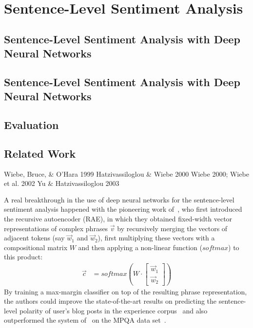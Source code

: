 \section{Sentence-Level Sentiment Analysis}\label{sec:snt:slsa}

\subsection{Sentence-Level Sentiment Analysis with Deep Neural Networks}

\subsection{Sentence-Level Sentiment Analysis with Deep Neural Networks}

\subsection{Evaluation}

\subsection{Related Work}

\citet{Kobayashi:07}
Wiebe, Bruce, \& O'Hara 1999
Hatzivassiloglou \& Wiebe 2000
Wiebe 2000; Wiebe et al. 2002
Yu \& Hatzivassiloglou 2003


\citet{Yessenalina:11}

A real breakthrough in the use of deep neural networks for the
sentence-level sentiment analysis happened with the pioneering work
of~\citet{Socher:11}, who first introduced the recursive autoencoder
(RAE), in which they obtained fixed-width vector representations of
complex phrases $\vec{v}$ by recursively merging the vectors of
adjacent tokens (say $\vec{w}_1$ and $\vec{w}_2$), first multiplying
these vectors with a compositional matrix $W$ and then applying a
non-linear function ($softmax$) to this product:
\begin{align*}
  \vec{c} &= softmax\left(W\cdot\begin{bmatrix}
  \vec{w}_1\\
  \vec{w}_2
  \end{bmatrix}\right)
\end{align*}
By training a max-margin classifier on top of the resulting phrase
representation, the authors could improve the state-of-the-art results
on predicting the sentence-level polarity of user's blog posts in the
experience corpus~\cite{Potts:10} and also outperformed the system
of~\citet{Nasukawa:03} on the MPQA data set~\cite{Wiebe:05}.

